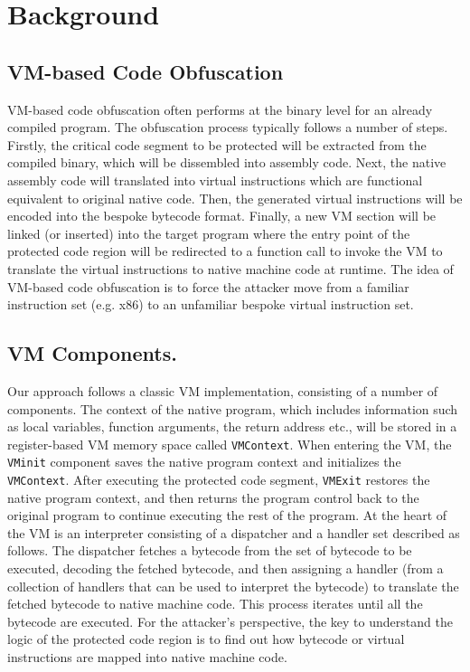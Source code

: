 \section{Background}\label{sec:bak}

\subsection{VM-based Code Obfuscation}
VM-based code obfuscation often performs at the binary level for an already
compiled program. The obfuscation process typically follows a number of
steps.  Firstly, the
critical code segment to be protected will be extracted from the compiled
binary, which will be dissembled into assembly code. Next, the native
assembly code will translated into virtual instructions which are functional
equivalent to original native code. Then, the
generated virtual instructions will be encoded into the bespoke bytecode
format.  Finally, a new VM section will be linked (or inserted) into the
target program where the entry point of the protected code region will be
redirected to a function call to invoke the VM to translate the virtual
instructions to native machine code at runtime. The idea of VM-based code
obfuscation is to force the attacker move from a familiar
instruction set (e.g. x86) to an unfamiliar bespoke virtual instruction set. 


\subsection{VM Components.} Our approach follows a classic VM implementation,
consisting of a number of components.  The context of the native program, which includes
information such as local variables, function arguments, the return address etc.,
will be stored in a register-based VM memory space called \texttt{VMContext}. When entering the VM, the \texttt{VMinit}
component saves the native program context and initializes the
\texttt{VMContext}. After executing the protected code segment,  \texttt{VMExit} restores the
native program context, and then returns the program control back to the
original program to continue executing the rest of the program.
At the heart of the VM is an interpreter consisting of a
dispatcher and a handler set described as follows. The dispatcher fetches a
bytecode from the set of bytecode to be executed, decoding the fetched
bytecode, and then assigning a handler (from a collection of handlers that can be used
to interpret the bytecode)  to translate the fetched bytecode to native
machine code. This process iterates until all the bytecode are executed.
For the attacker's perspective, the key to understand the 
logic of the protected code region is to find out how
bytecode or virtual instructions are mapped into native machine code. 

